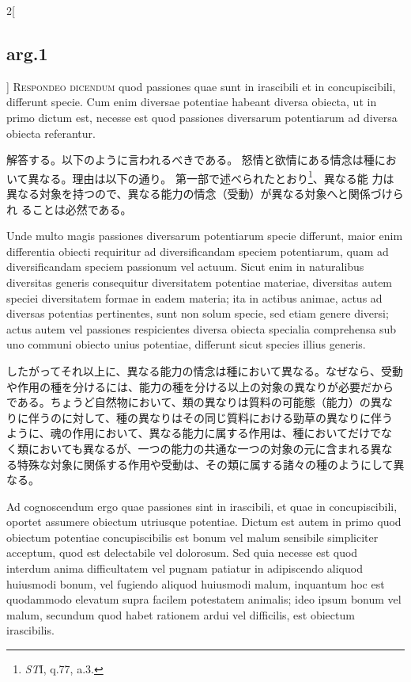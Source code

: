 \documentclass[paper=a4paper,fontsize=10pt,jafontsize=9pt,titlepage]{jlreq}
\begin{document}
\begin{paracol}{2}[\subsection{arg.1}]
{\scshape Respondeo dicendum} quod passiones quae sunt in irascibili et in
concupiscibili, differunt specie. Cum enim diversae potentiae habeant
diversa obiecta, ut in primo dictum est, necesse est quod passiones
diversarum potentiarum ad diversa obiecta referantur.

\switchcolumn

解答する。以下のように言われるべきである。
怒情と欲情にある情念は種において異なる。理由は以下の通り。
第一部で述べられたとおり\footnote{{\itshape ST}I, q.77, a.3.}、異なる能
 力は異なる対象を持つので、異なる能力の情念（受動）が異なる対象へと関係づけられ
 ることは必然である。

\switchcolumn*

Unde multo magis
passiones diversarum potentiarum specie differunt, maior enim
differentia obiecti requiritur ad diversificandam speciem potentiarum,
quam ad diversificandam speciem passionum vel actuum. Sicut enim in
naturalibus diversitas generis consequitur diversitatem potentiae
materiae, diversitas autem speciei diversitatem formae in eadem materia;
ita in actibus animae, actus ad diversas potentias pertinentes, sunt non
solum specie, sed etiam genere diversi; actus autem vel passiones
respicientes diversa obiecta specialia comprehensa sub uno communi
obiecto unius potentiae, differunt sicut species illius generis.

\switchcolumn

したがってそれ以上に、異なる能力の情念は種において異なる。なぜなら、受動
 や作用の種を分けるには、能力の種を分ける以上の対象の異なりが必要だから
 である。ちょうど自然物において、類の異なりは質料の可能態（能力）の異な
 りに伴うのに対して、種の異なりはその同じ質料における勁草の異なりに伴う
 ように、魂の作用において、異なる能力に属する作用は、種においてだけでな
 く類においても異なるが、一つの能力の共通な一つの対象の元に含まれる異な
 る特殊な対象に関係する作用や受動は、その類に属する諸々の種のようにして異なる。

\switchcolumn*

Ad
cognoscendum ergo quae passiones sint in irascibili, et quae in
concupiscibili, oportet assumere obiectum utriusque potentiae. Dictum
est autem in primo quod obiectum potentiae concupiscibilis est bonum vel
malum sensibile simpliciter acceptum, quod est delectabile vel
dolorosum. Sed quia necesse est quod interdum anima difficultatem vel
pugnam patiatur in adipiscendo aliquod huiusmodi bonum, vel fugiendo
aliquod huiusmodi malum, inquantum hoc est quodammodo elevatum supra
facilem potestatem animalis; ideo ipsum bonum vel malum, secundum quod
habet rationem ardui vel difficilis, est obiectum
irascibilis.


\end{paracol}
\end{document}
